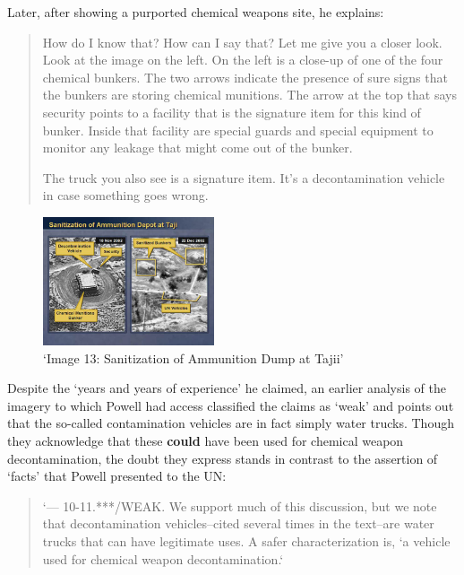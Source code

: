 \documentclass[11pt,oneside,notitlepage]{report}
\begin{document}
{{Later, after showing a purported chemical weapons site, he explains:

\begin{quote}
How do I know that? How can I say that? Let me give you a closer look. Look at the image on the left. On the left is a close-up of one of the four chemical bunkers. The two arrows indicate the presence of sure signs that the bunkers are storing chemical munitions. The arrow at the top that says security points to a facility that is the signature item for this kind of bunker. Inside that facility are special guards and special equipment to monitor any leakage that might come out of the bunker.

The truck you also see is a signature item. It's a decontamination vehicle in case something goes wrong.
\cite{guardian2003powell}
\end{quote}

\begin{figure}
	\begin{flushright}
		\includegraphics[width=0.45\textwidth]{images/iraq-image-13.jpg}
		\caption{`Image 13: Sanitization of Ammunition Dump at Tajii' \cite{gwu2003eyes}}
	\end{flushright}
\end{figure}

Despite the `years and years of experience' he claimed, an earlier analysis of the imagery to which Powell had access classified the claims as `weak' and points out that the so-called contamination vehicles are in fact simply water trucks. Though they acknowledge that these \textbf{could} have been used for chemical weapon decontamination, the doubt they express stands in contrast to the assertion of `facts' that Powell presented to the UN: 

\begin{quote}
	`--- 10-11.***/WEAK. We support much of this discussion, but we note that decontamination vehicles--cited several times in the text--are water trucks that can have legitimate uses. A safer characterization is, `a vehicle used for chemical weapon decontamination.`


\end{quote}}}
\end{document}
